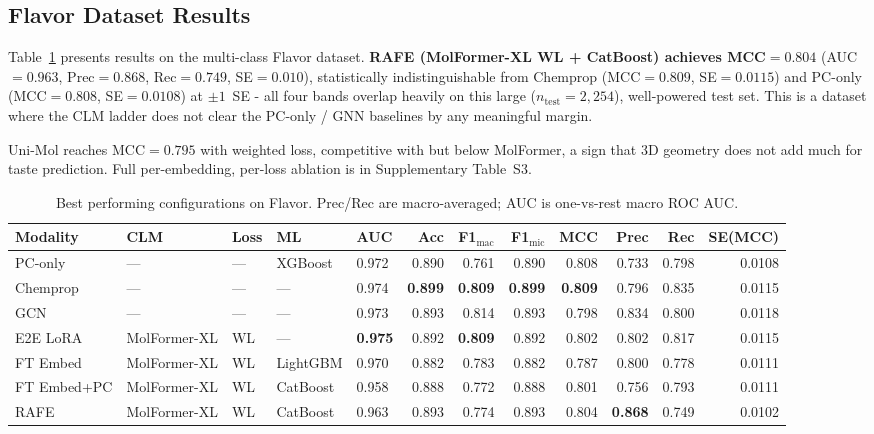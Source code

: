 \documentclass[final,1p,times]{elsarticle}
\begin{document}
\subsection{Flavor Dataset Results}
Table~\ref{tab:flavor} presents results on the multi-class Flavor dataset. \textbf{RAFE (MolFormer-XL WL + CatBoost) achieves MCC$=0.804$} (AUC$=0.963$, Prec$=0.868$, Rec$=0.749$, SE$=0.010$), statistically indistinguishable from Chemprop (MCC$=0.809$, SE$=0.0115$) and PC-only (MCC$=0.808$, SE$=0.0108$) at $\pm1$~SE - all four bands overlap heavily on this large ($n_\text{test}=2{,}254$), well-powered test set. This is a dataset where the CLM ladder does not clear the PC-only / GNN baselines by any meaningful margin.

Uni-Mol reaches MCC$=0.795$ with weighted loss, competitive with but below MolFormer, a sign that 3D geometry does not add much for taste prediction. Full per-embedding, per-loss ablation is in Supplementary Table~S3.

\begin{table}[t]
\centering
\caption{Best performing configurations on Flavor. Prec/Rec are macro-averaged; AUC is one-vs-rest macro ROC AUC.}
\label{tab:flavor}
\begin{adjustbox}{max width=\textwidth}
\begin{tabular}{lllllrrrrrrr}
\toprule
Modality & CLM & Loss & ML & AUC & Acc & F1$_\text{mac}$ & F1$_\text{mic}$ & MCC & Prec & Rec & SE(MCC) \\
\midrule
PC-only    & --- & --- & XGBoost  & 0.972 & 0.890 & 0.761 & 0.890 & 0.808 & 0.733 & 0.798 & 0.0108 \\
Chemprop   & --- & --- & --- & 0.974 & \textbf{0.899} & \textbf{0.809} & \textbf{0.899} & \textbf{0.809} & 0.796 & 0.835 & 0.0115 \\
GCN        & --- & --- & --- & 0.973 & 0.893 & 0.814 & 0.893 & 0.798 & 0.834 & 0.800 & 0.0118 \\
\midrule
E2E LoRA   & MolFormer-XL & WL & --- & \textbf{0.975} & 0.892 & \textbf{0.809} & 0.892 & 0.802 & 0.802 & 0.817 & 0.0115 \\
\midrule
FT Embed   & MolFormer-XL & WL & LightGBM& 0.970 & 0.882 & 0.783 & 0.882 & 0.787 & 0.800 & 0.778 & 0.0111 \\
FT Embed+PC& MolFormer-XL & WL & CatBoost& 0.958 & 0.888 & 0.772 & 0.888 & 0.801 & 0.756 & 0.793 & 0.0111 \\
\midrule
RAFE       & MolFormer-XL & WL & CatBoost& 0.963 & 0.893 & 0.774 & 0.893 & 0.804 & \textbf{0.868} & 0.749 & 0.0102 \\
\bottomrule
\end{tabular}
\end{adjustbox}
\end{table}
\end{document}
